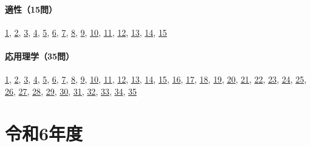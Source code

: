 \paragraph{適性（15問）} \hyperref[q:r05-reg-apt-01]{1}, \hyperref[q:r05-reg-apt-02]{2}, \hyperref[q:r05-reg-apt-03]{3}, \hyperref[q:r05-reg-apt-04]{4}, \hyperref[q:r05-reg-apt-05]{5}, \hyperref[q:r05-reg-apt-06]{6}, \hyperref[q:r05-reg-apt-07]{7}, \hyperref[q:r05-reg-apt-08]{8}, \hyperref[q:r05-reg-apt-09]{9}, \hyperref[q:r05-reg-apt-10]{10}, \hyperref[q:r05-reg-apt-11]{11}, \hyperref[q:r05-reg-apt-12]{12}, \hyperref[q:r05-reg-apt-13]{13}, \hyperref[q:r05-reg-apt-14]{14}, \hyperref[q:r05-reg-apt-15]{15}
\paragraph{応用理学（35問）} \hyperref[q:r05-reg-applied-01]{1}, \hyperref[q:r05-reg-applied-02]{2}, \hyperref[q:r05-reg-applied-03]{3}, \hyperref[q:r05-reg-applied-04]{4}, \hyperref[q:r05-reg-applied-05]{5}, \hyperref[q:r05-reg-applied-06]{6}, \hyperref[q:r05-reg-applied-07]{7}, \hyperref[q:r05-reg-applied-08]{8}, \hyperref[q:r05-reg-applied-09]{9}, \hyperref[q:r05-reg-applied-10]{10}, \hyperref[q:r05-reg-applied-11]{11}, \hyperref[q:r05-reg-applied-12]{12}, \hyperref[q:r05-reg-applied-13]{13}, \hyperref[q:r05-reg-applied-14]{14}, \hyperref[q:r05-reg-applied-15]{15}, \hyperref[q:r05-reg-applied-16]{16}, \hyperref[q:r05-reg-applied-17]{17}, \hyperref[q:r05-reg-applied-18]{18}, \hyperref[q:r05-reg-applied-19]{19}, \hyperref[q:r05-reg-applied-20]{20}, \hyperref[q:r05-reg-applied-21]{21}, \hyperref[q:r05-reg-applied-22]{22}, \hyperref[q:r05-reg-applied-23]{23}, \hyperref[q:r05-reg-applied-24]{24}, \hyperref[q:r05-reg-applied-25]{25}, \hyperref[q:r05-reg-applied-26]{26}, \hyperref[q:r05-reg-applied-27]{27}, \hyperref[q:r05-reg-applied-28]{28}, \hyperref[q:r05-reg-applied-29]{29}, \hyperref[q:r05-reg-applied-30]{30}, \hyperref[q:r05-reg-applied-31]{31}, \hyperref[q:r05-reg-applied-32]{32}, \hyperref[q:r05-reg-applied-33]{33}, \hyperref[q:r05-reg-applied-34]{34}, \hyperref[q:r05-reg-applied-35]{35}
\section{令和6年度}
